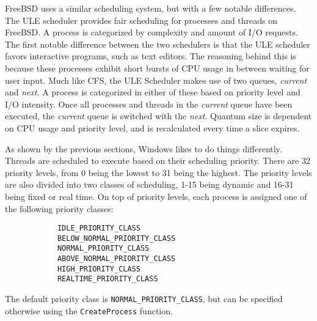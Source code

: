 \documentclass[10pt, onecolumn]{IEEEtran}
\begin{document}
        \vspace{3mm}
        
        FreeBSD uses a similar scheduling system, but with a few notable differences. The ULE scheduler provides fair scheduling for processes and threads on FreeBSD\cite{ulesched}. A process is categorized by complexity and amount of I/O requests. The first notable difference between the two schedulers is that the ULE scheduler favors interactive programs, such as text editors. The reasoning behind this is because these processes exhibit short bursts of CPU usage in between waiting for user input. Much like CFS, the ULE Scheduler makes use of two queues, \textit{current} and \textit{next}. A process is categorized in either of these based on priority level and I/O intensity. Once all processes and threads in the \textit{current} queue have been executed, the \textit{current} queue is switched with the \textit{next}. Quantum size is dependent on CPU usage and priority level, and is recalculated every time a slice expires. 
        
        \vspace{3mm}
        
        As shown by the previous sections, Windows likes to do things differently. Threads are scheduled to execute based on their scheduling priority. There are 32 priority levels, from 0 being the lowest to 31 being the highest. The priority levels are also divided into two classes of scheduling, 1-15 being dynamic and 16-31 being fixed or real time. On top of priority levels, each process is assigned one of the following priority classes:
        
                    
        \begin{lstlisting}
            IDLE_PRIORITY_CLASS
            BELOW_NORMAL_PRIORITY_CLASS
            NORMAL_PRIORITY_CLASS
            ABOVE_NORMAL_PRIORITY_CLASS
            HIGH_PRIORITY_CLASS
            REALTIME_PRIORITY_CLASS
        \end{lstlisting}
    
        The default priority class is \texttt{NORMAL\_PRIORITY\_CLASS}, but can be specified otherwise using the \texttt{CreateProcess} function.
        
\end{document}
